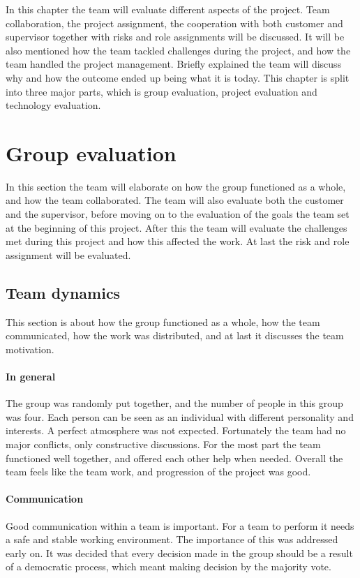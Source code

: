 In this chapter the team will evaluate different aspects of the project. 
Team collaboration, the project assignment, the cooperation with both customer and supervisor together with risks and role assignments will be discussed. It will be also mentioned how the team tackled challenges during the project, and how the team handled the project management. Briefly explained the team will discuss why and how the outcome ended up being what it is today.
This chapter is split into three major parts, which is group evaluation, project evaluation and technology evaluation. 

\section{Group evaluation}
In this section the team will elaborate on how the group functioned as a whole, and how the team collaborated. The team will also evaluate both the customer and the supervisor, before moving on to the evaluation of the goals the team set at the beginning of this project. After this the team will evaluate the challenges met during this project and how this affected the work. At last the risk and role assignment will be evaluated.

\subsection{Team dynamics}
This section is about how the group functioned as a whole, how the team communicated, how the work was distributed, and at last it discusses the team motivation.

\paragraph{In general}
The group was randomly put together, and the number of people in this group was four.
Each person can be seen as an individual with different personality and interests. A perfect atmosphere was not expected. Fortunately the team had no major conflicts, only constructive discussions. For the most part the team functioned well together, and offered each other help when needed. 
Overall the team feels like the team work, and progression of the project was good.

\paragraph{Communication}
Good communication within a team is important. For a team to perform it needs a safe and stable working environment. The importance of this was addressed early on. 
It was decided that every decision made in the group should be a result of a democratic process, which meant making decision by the majority vote. 


